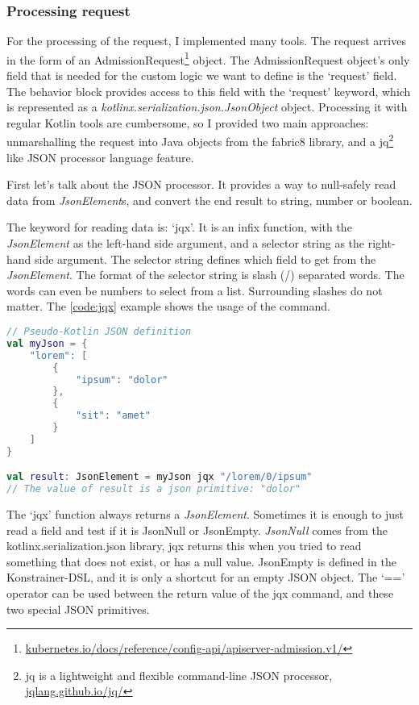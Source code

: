 \subsubsection{Processing request}

For the processing of the request, I implemented many tools. The request arrives in the form of an AdmissionRequest\footnote{\url{kubernetes.io/docs/reference/config-api/apiserver-admission.v1/}} object. The AdmissionRequest object's only field that is needed for the custom logic we want to define is the `request' field. The behavior block provides access to this field with the `request' keyword, which is represented as a \emph{kotlinx.serialization.json.JsonObject }object. Processing it with regular Kotlin tools are cumbersome, so I provided two main approaches: unmarshalling the request into Java objects from the fabric8 library, and a jq\footnote{jq is a lightweight and flexible command-line JSON processor, \url{jqlang.github.io/jq/}} like JSON processor language feature. 

First let's talk about the JSON processor. It provides a way to null-safely read data from \emph{JsonElement}s, and convert the end result to string, number or boolean. 

The keyword for reading data is: `jqx'. It is an infix function, with the \emph{JsonElement} as the left-hand side argument, and a selector string as the right-hand side argument. The selector string defines which field to get from the \emph{JsonElement}. The format of the selector string is slash (/) separated words. The words can even be numbers to select from a list. Surrounding slashes do not matter. The \ref{code:jqx} example shows the usage of the command.

\begin{lstlisting}[caption={Usage of `jqx'},language=Kotlin,label=code:jqx]
// Pseudo-Kotlin JSON definition
val myJson = {
    "lorem": [
        {
            "ipsum": "dolor"
        },
        {
            "sit": "amet"
        }
    ]
}

val result: JsonElement = myJson jqx "/lorem/0/ipsum"
// The value of result is a json primitive: "dolor"
\end{lstlisting}

The `jqx' function always returns a \emph{JsonElement}. Sometimes it is enough to just read a field and test if it is JsonNull or JsonEmpty. \emph{JsonNull} comes from the kotlinx.serialization.json library, jqx returns this when you tried to read something that does not exist, or has a null value. JsonEmpty is defined in the Konstrainer-DSL, and it is only a shortcut for an empty JSON object. The `==' operator can be used between the return value of the jqx command, and these two special JSON primitives.

